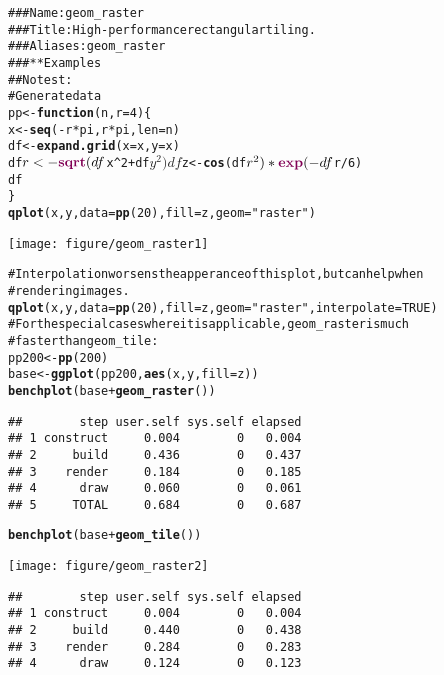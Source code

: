 \documentclass[a4paper,titlepage]{tufte-handout}\usepackage{graphicx, color}
\makeatletter
\def\maxwidth{ %
  \ifdim\Gin@nat@width>\linewidth
    \linewidth
  \else
    \Gin@nat@width
  \fi
}
\newcommand{\hlfunctioncall}[1]{\textcolor[rgb]{0.501960784313725,0,0.329411764705882}{\textbf{#1}}}%
\newcommand{\hlstring}[1]{\textcolor[rgb]{0.6,0.6,1}{#1}}%
\newcommand{\hlcomment}[1]{\textcolor[rgb]{0.180392156862745,0.6,0.341176470588235}{#1}}%
\newenvironment{kframe}{%
 \def\at@end@of@kframe{}%
 \ifinner\ifhmode%
  \def\at@end@of@kframe{\end{minipage}}%
  \begin{minipage}{\columnwidth}%
 \fi\fi%
 \def\FrameCommand##1{\hskip\@totalleftmargin \hskip-\fboxsep
 \colorbox{shadecolor}{##1}\hskip-\fboxsep
     \hskip-\linewidth \hskip-\@totalleftmargin \hskip\columnwidth}%
 \MakeFramed {\advance\hsize-\width
   \@totalleftmargin\z@ \linewidth\hsize
   \@setminipage}}%
 {\par\unskip\endMakeFramed%
 \at@end@of@kframe}
\newenvironment{knitrout}{}{} %
\makeatother
\begin{document}
\begin{knitrout}
\color{fgcolor}\begin{kframe}
\begin{alltt}
\hlcomment{### Name: geom_raster}
\hlcomment{### Title: High-performance rectangular tiling.}
\hlcomment{### Aliases: geom_raster}
\hlcomment{### ** Examples}
\hlcomment{## No test: }
\hlcomment{# Generate data}
pp <- \hlfunctioncall{function} (n,r=4) \{
 x <- \hlfunctioncall{seq}(-r*pi, r*pi, len=n)
 df <- \hlfunctioncall{expand.grid}(x=x, y=x)
 df$r <- \hlfunctioncall{sqrt}(df$x^2 + df$y^2)
 df$z <- \hlfunctioncall{cos}(df$r^2)*\hlfunctioncall{exp}(-df$r/6)
 df
\}
\hlfunctioncall{qplot}(x, y, data = \hlfunctioncall{pp}(20), fill = z, geom = \hlstring{"raster"})
\end{alltt}
\end{kframe}\texttt{[image: figure/geom\_raster1]} \begin{kframe}\begin{alltt}
\hlcomment{# Interpolation worsens the apperance of this plot, but can help when}
\hlcomment{# rendering images.}
\hlfunctioncall{qplot}(x, y, data = \hlfunctioncall{pp}(20), fill = z, geom = \hlstring{"raster"}, interpolate = TRUE)
\hlcomment{# For the special cases where it is applicable, geom_raster is much}
\hlcomment{# faster than geom_tile:}
pp200 <- \hlfunctioncall{pp}(200)
base <- \hlfunctioncall{ggplot}(pp200, \hlfunctioncall{aes}(x, y, fill = z))
\hlfunctioncall{benchplot}(base + \hlfunctioncall{geom_raster}())
\end{alltt}
\begin{verbatim}
##        step user.self sys.self elapsed
## 1 construct     0.004        0   0.004
## 2     build     0.436        0   0.437
## 3    render     0.184        0   0.185
## 4      draw     0.060        0   0.061
## 5     TOTAL     0.684        0   0.687
\end{verbatim}
\begin{alltt}
\hlfunctioncall{benchplot}(base + \hlfunctioncall{geom_tile}())
\end{alltt}
\end{kframe}\texttt{[image: figure/geom\_raster2]} \begin{kframe}\begin{verbatim}
##        step user.self sys.self elapsed
## 1 construct     0.004        0   0.004
## 2     build     0.440        0   0.438
## 3    render     0.284        0   0.283
## 4      draw     0.124        0   0.123

\end{verbatim}
\end{kframe}
\end{knitrout}
\end{document}
